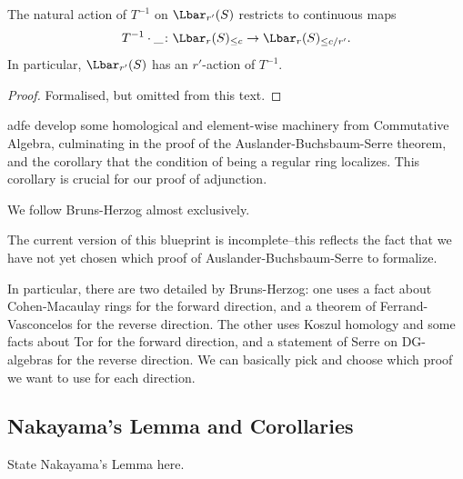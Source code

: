 \begin{lemma}
  \label{Lbar_with_Tinv}
  \leanok
  The natural action of $T^{-1}$ on $\Lbar_{r'}(S)$
  restricts to continuous maps
  \[
    T^{-1} \cdot \_ \colon
    \Lbar_r(S)_{\le c} \to
    \Lbar_r(S)_{\le c/r'}.
  \]
  In particular, $\Lbar_{r'}(S)$
  has an $r'$-action of $T^{-1}$.
\end{lemma}

\begin{proof}
  \leanok
  Formalised, but omitted from this text.
\end{proof}



adfe develop some 
homological and element-wise machinery
from Commutative Algebra, culminating 
in the proof of the Auslander-Buchsbaum-Serre 
theorem, and 
the corollary that the condition of being 
a regular ring localizes. 
This corollary is crucial for our proof of adjunction.

We follow Bruns-Herzog almost exclusively.

The current version of this blueprint is incomplete--this
reflects the fact that we have not yet chosen which proof
of Auslander-Buchsbaum-Serre to formalize.

In particular, there are two detailed by Bruns-Herzog:
one uses a fact about Cohen-Macaulay rings for the forward
direction, and a theorem of Ferrand-Vasconcelos for the
reverse direction. 
The other uses Koszul homology and some facts about Tor
for the forward direction, and a statement of Serre 
on DG-algebras for the reverse direction.
We can basically pick and choose which proof we want to use
for each direction.



\subsection{Nakayama's Lemma and Corollaries}

\begin{lemma}
  \label{lem:nakayama}
  State Nakayama's Lemma here.
\end{lemma}

